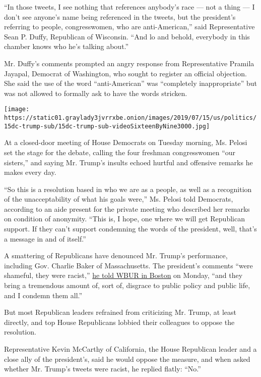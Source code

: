 ``In those tweets, I see nothing that references anybody's race --- not
a thing --- I don't see anyone's name being referenced in the tweets,
but the president's referring to people, congresswomen, who are
anti-American,'' said Representative Sean P. Duffy, Republican of
Wisconsin. ``And lo and behold, everybody in this chamber knows who he's
talking about.''

Mr. Duffy's comments prompted an angry response from Representative
Pramila Jayapal, Democrat of Washington, who sought to register an
official objection. She said the use of the word ``anti-American'' was
``completely inappropriate'' but was not allowed to formally ask to have
the words stricken.

\texttt{[image: https://static01.graylady3jvrrxbe.onion/images/2019/07/15/us/politics/15dc-trump-sub/15dc-trump-sub-videoSixteenByNine3000.jpg]}

At a closed-door meeting of House Democrats on Tuesday morning, Ms.
Pelosi set the stage for the debate, calling the four freshman
congresswomen ``our sisters,'' and saying Mr. Trump's insults echoed
hurtful and offensive remarks he makes every day.

``So this is a resolution based in who we are as a people, as well as a
recognition of the unacceptability of what his goals were,'' Ms. Pelosi
told Democrats, according to an aide present for the private meeting who
described her remarks on condition of anonymity. ``This is, I hope, one
where we will get Republican support. If they can't support condemning
the words of the president, well, that's a message in and of itself.''

A smattering of Republicans have denounced Mr. Trump's performance,
including Gov. Charlie Baker of Massachusetts. The president's comments
``were shameful, they were racist,''
\href{https://www.wbur.org/news/2019/07/15/baker-republican-trump-tweets-pressley}{he
told WBUR in Boston} on Monday, ``and they bring a tremendous amount of,
sort of, disgrace to public policy and public life, and I condemn them
all.''

But most Republican leaders refrained from criticizing Mr. Trump, at
least directly, and top House Republicans lobbied their colleagues to
oppose the resolution.

Representative Kevin McCarthy of California, the House Republican leader
and a close ally of the president's, said he would oppose the measure,
and when asked whether Mr. Trump's tweets were racist, he replied
flatly: ``No.''

